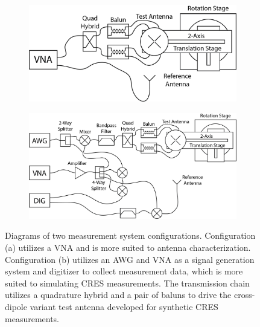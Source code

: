 \begin{figure}[htbp]
    \centering
    \begin{subfigure}[b]{0.43\textwidth}
        \centering
        \includegraphics[width=1\textwidth]{figs/Chapter-5/230409_vna_sys_diag.png}
        \caption{\label{fig:chap5-vna-meas-sys}}
    \end{subfigure}
    \hfill
    \begin{subfigure}[b]{0.52\textwidth}
        \centering
        \includegraphics[width=1\textwidth]{figs/Chapter-5/230408_detail_meas_sys_diag.png}
        \caption{\label{fig:chap5-dig-meas-sys}}
    \end{subfigure}
    \hfill
    \caption{\label{fig:meas-sys-diagrams}Diagrams of two measurement system configurations. Configuration (a) utilizes a VNA and is more suited to antenna characterization. Configuration (b) utilizes an AWG and VNA as a signal generation system and digitizer to collect measurement data, which is more suited to simulating CRES measurements. The transmission chain utilizes a quadrature hybrid and a pair of baluns to drive the cross-dipole variant test antenna developed for synthetic CRES measurements.}
\end{figure}

